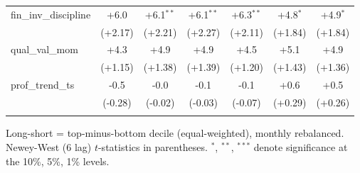 \begin{table}[htbp]
\begin{threeparttable}
\begin{tabular}{lcccccc}
\addlinespace
fin\_inv\_discipline & +6.0 & +6.1$^{**}$ & +6.1$^{**}$ & +6.3$^{**}$ & +4.8$^{*}$ & +4.9$^{*}$ \\
 & (+2.17) & (+2.21) & (+2.27) & (+2.11) & (+1.84) & (+1.84) \\
\addlinespace
qual\_val\_mom & +4.3 & +4.9 & +4.9 & +4.5 & +5.1 & +4.9 \\
 & (+1.15) & (+1.38) & (+1.39) & (+1.20) & (+1.43) & (+1.36) \\
\addlinespace
prof\_trend\_ts & -0.5 & -0.0 & -0.1 & -0.1 & +0.6 & +0.5 \\
 & (-0.28) & (-0.02) & (-0.03) & (-0.07) & (+0.29) & (+0.26) \\
\addlinespace
\bottomrule
\end{tabular}
\begin{tablenotes}\footnotesize
\item Long-short = top-minus-bottom decile (equal-weighted), monthly rebalanced. Newey-West (6 lag) $t$-statistics in parentheses. $^{*}$, $^{**}$, $^{***}$ denote significance at the 10\%, 5\%, 1\% levels.
\end{tablenotes}
\end{threeparttable}
\end{table}